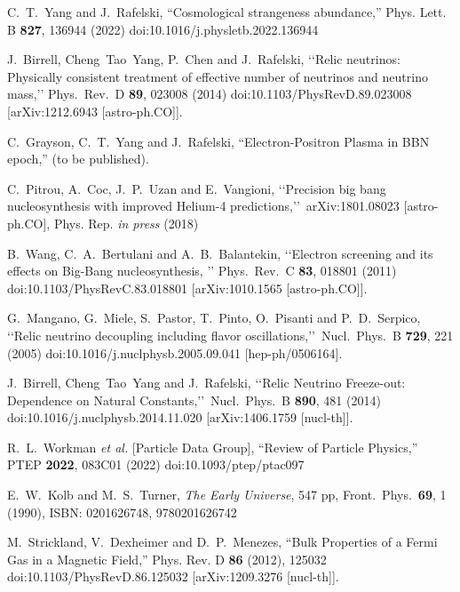 \documentclass[universe,article,submit,moreauthors,pdftex,a4paper]{Definitions/mdpi}
\begin{document}
\begin{thebibliography}{99}
C.~T.~Yang and J.~Rafelski,
``Cosmological strangeness abundance,''
Phys. Lett. B \textbf{827}, 136944 (2022)
doi:10.1016/j.physletb.2022.136944

J.~Birrell, Cheng~Tao~Yang, P.~Chen and J.~Rafelski,
\lq\lq Relic neutrinos: Physically consistent treatment of effective number of neutrinos and neutrino mass,\rq\rq
Phys.\ Rev.\ D {\bf 89}, 023008 (2014)
doi:10.1103/PhysRevD.89.023008
[arXiv:1212.6943 [astro-ph.CO]].

C.~Grayson, C.~T.~Yang and J.~Rafelski,
``Electron-Positron Plasma in BBN epoch,'' (to be published).

C.~Pitrou, A.~Coc, J.~P.~Uzan and E.~Vangioni,
\lq\lq Precision big bang nucleosynthesis with improved Helium-4 predictions,\rq\rq\ 
arXiv:1801.08023 [astro-ph.CO], Phys. Rep. {\it in press} (2018)


B.~Wang, C.~A.~Bertulani and A.~B.~Balantekin,
\lq\lq Electron screening and its effects on Big-Bang nucleosynthesis, \rq\rq
Phys.\ Rev.\ C {\bf 83}, 018801 (2011)
doi:10.1103/PhysRevC.83.018801
[arXiv:1010.1565 [astro-ph.CO]].

G.~Mangano, G.~Miele, S.~Pastor, T.~Pinto, O.~Pisanti and P.~D.~Serpico,
\lq\lq Relic neutrino decoupling including flavor oscillations,\rq\rq\
Nucl.\ Phys.\ B {\bf 729}, 221 (2005)
doi:10.1016/j.nuclphysb.2005.09.041
[hep-ph/0506164].

 J.~Birrell, Cheng~Tao~Yang and J.~Rafelski,
\lq\lq Relic Neutrino Freeze-out: Dependence on Natural Constants,\rq\rq\
 Nucl.\ Phys.\ B {\bf 890}, 481 (2014)
 doi:10.1016/j.nuclphysb.2014.11.020
 [arXiv:1406.1759 [nucl-th]].


R.~L.~Workman \textit{et al.} [Particle Data Group],
``Review of Particle Physics,''
PTEP \textbf{2022}, 083C01 (2022)
doi:10.1093/ptep/ptac097

E.~W.~Kolb and M.~S.~Turner,
\emph{The Early Universe},
547 pp, Front.\ Phys.\ {\bf 69}, 1 (1990),
ISBN: 0201626748, 9780201626742

M.~Strickland, V.~Dexheimer and D.~P.~Menezes,
``Bulk Properties of a Fermi Gas in a Magnetic Field,''
Phys. Rev. D \textbf{86} (2012), 125032
doi:10.1103/PhysRevD.86.125032
[arXiv:1209.3276 [nucl-th]].


\end{thebibliography}
\end{document}
